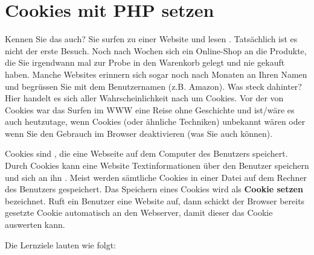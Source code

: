 \toggletrue{image}
\toggletrue{imagehover}

\chapter{Cookies mit \acs{PHP} setzen}
\label{chapter-cookies-php}

Kennen Sie das auch? Sie surfen zu einer Website und lesen . Tatsächlich ist es nicht der erste Besuch. Noch nach Wochen  sich ein Online-Shop an die Produkte, die Sie irgendwann mal zur Probe in den Warenkorb gelegt und nie gekauft haben. Manche Websites erinnern sich sogar noch nach Monaten an Ihren Namen und begrüssen Sie mit dem Benutzernamen (z.B. Amazon). Was steck dahinter? Hier handelt es sich aller Wahrscheinlichkeit nach um Cookies. Vor der  von Cookies war das Surfen im \ac{WWW} eine Reise ohne Geschichte und ist/wäre es auch heutzutage, wenn Cookies (oder ähnliche Techniken) unbekannt wären oder wenn Sie den Gebrauch im Browser deaktivieren (was Sie auch können).

\begin{definition}[Cookie]
Cookies sind , die eine Webseite auf dem Computer des Benutzers speichert. Durch Cookies kann eine Website Textinformationen über den Benutzer speichern und sich an ihn . Meist werden sämtliche Cookies in einer Datei auf dem Rechner des Benutzers gespeichert. Das Speichern eines Cookies wird als \textbf{Cookie setzen} bezeichnet. Ruft ein Benutzer eine Website auf, dann schickt der Browser bereits gesetzte Cookie automatisch an den Webserver, damit dieser das Cookie auswerten kann.
\end{definition}

Die Lernziele lauten wie folgt:

\newcommand{\cookiesPhpLernziele}{
\protect\begin{todolist}
\item Sie erklären an einem Beispiel was man im \ac{WWW} unter einem Cookie versteht.
\item Sie informieren über die Eckdaten von Cookies und deren Sicherheitsbedenken.
\item Sie setzen mit \ac{PHP} ein Cookie und lesen es wieder aus.
\end{todolist}
}

